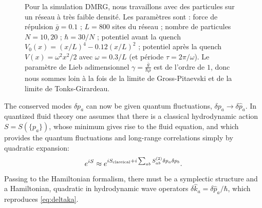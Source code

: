 \documentclass[twocolumn,amsfonts,showpacs,superscriptaddress]{revtex4-1}
\begin{document}
\begin{figure}[t]
{{Pour la simulation DMRG, nous travaillons avec des particules sur un réseau à très faible densité. Les paramètres sont : force de répulsion $\bar{g} = 0.1$ ; $L=800$ sites du réseau ; nombre de particules $N=10, 20$ ; $\hbar = 30/N$ ; potentiel avant la quench $V_0(x)= (x/L)^4 - 0.12 (x/L)^2$ ; potentiel après la quench $V(x) = \omega^2 x^2 /2$ avec $\omega=0.3/L$ (et période $\tau= 2\pi/\omega$). Le paramètre de Lieb adimensionnel $\gamma = \frac{\bar{g}}{\hbar \rho}$ est de l'ordre de $1$, donc nous sommes loin à la fois de la limite de Gross-Pitaevski et de la limite de Tonks-Girardeau.}
}
\label{movie}
\end{figure}



\vspace{0.1cm} \; The conserved modes $\delta p_a$ can now be given quantum fluctuations, $\delta p_a\rightarrow \delta\hat p_a$. In quantized fluid theory one assumes that there is a classical hydrodynamic action $S = S(\{p_a\})$, whose minimum gives rise to the fluid equation, and which provides the quantum fluctuations and long-range correlations simply by quadratic expansion:
\begin{equation}
	e^{iS} \approx e^{iS_{\rm classical} + i\sum_{ab} S^{(2)}_{ab} \delta p_a \delta p_{b} }.
\end{equation}
Passing to the Hamiltonian formalism, there must be a symplectic structure and a Hamiltonian, quadratic in hydrodynamic wave operators $\delta \hat k_a=\delta \hat p_a/\hbar$, which reproduces \eqref{eq:deltaka}.
\end{document}

